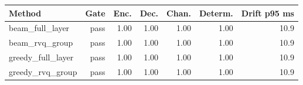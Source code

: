 \begin{tabular}{lrrrrrr}
\toprule
Method & Gate & Enc. & Dec. & Chan. & Determ. & Drift p95 ms \\
\midrule
beam\_full\_layer & pass & 1.00 & 1.00 & 1.00 & 1.00 & 10.9 \\
beam\_rvq\_group & pass & 1.00 & 1.00 & 1.00 & 1.00 & 10.9 \\
greedy\_full\_layer & pass & 1.00 & 1.00 & 1.00 & 1.00 & 10.9 \\
greedy\_rvq\_group & pass & 1.00 & 1.00 & 1.00 & 1.00 & 10.9 \\
\bottomrule
\end{tabular}
